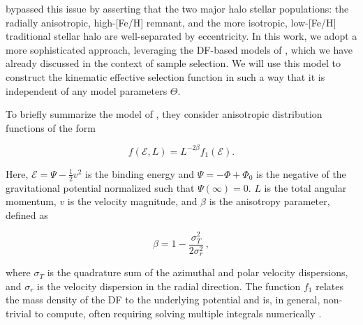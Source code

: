\cite{mackereth20} bypassed this issue by asserting that the two major halo stellar populations: the radially anisotropic, high-[Fe/H] \gse remnant, and the more isotropic, low-[Fe/H] traditional stellar halo are well-separated by eccentricity. In this work, we adopt a more sophisticated approach, leveraging the DF-based models of \cite{lane22}, which we have already discussed in the context of \gse sample selection. We will use this model to construct the kinematic effective selection function in such a way that it is independent of any model parameters $\Theta$.

To briefly summarize the model of \cite{lane22}, they consider anisotropic distribution functions of the form \parencite[see, e.g.][]{binney08}

\begin{equation}
    \label{ch3:eq:anisotropic-df}
    f(\mathcal{E},L) = L^{-2\beta}f_{1}(\mathcal{E}).
\end{equation}

Here, $\mathcal{E} = \Psi - \frac{1}{2}v^{2}$ is the binding energy and $\Psi = -\Phi + \Phi_{0}$ is the negative of the gravitational potential normalized such that $\Psi(\infty) = 0$. $L$ is the total angular momentum, $v$ is the velocity magnitude, and $\beta$ is the anisotropy parameter, defined as

\begin{equation}
    \label{ch3:eq:beta}
    \beta = 1- \frac{\sigma_{T}^{2}}{2\sigma^{2}_{r}}\,,
\end{equation}

\noindent where $\sigma_{T}$ is the quadrature sum of the azimuthal and polar velocity dispersions, and $\sigma_{r}$ is the velocity dispersion in the radial direction. The function $f_{1}$ relates the mass density of the DF to the underlying potential and is, in general, non-trivial to compute, often requiring solving multiple integrals numerically \parencite[For more information see ][ particularly Appendix A]{lane22}.

